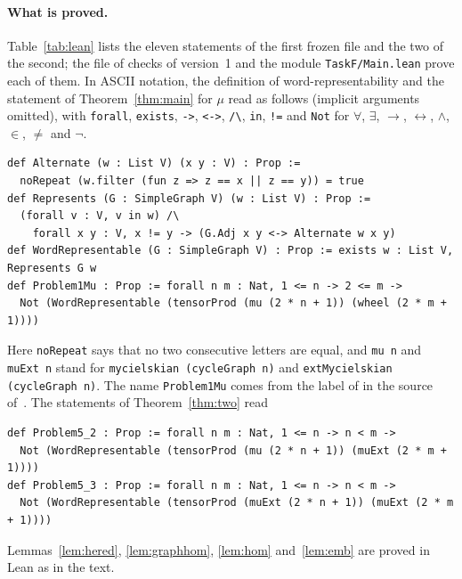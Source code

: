 \documentclass[11pt]{article}
\theoremstyle{remark}
\begin{document}
\paragraph{What is proved.}
Table~\ref{tab:lean} lists the eleven statements of the first frozen file and
the two of the second; the file of checks of version~1 and the module
\texttt{TaskF/Main.lean} prove each of them. In ASCII notation, the definition of
word-representability and the statement of Theorem~\ref{thm:main} for $\mu$
read as follows (implicit arguments omitted), with \texttt{forall}, \texttt{exists}, \texttt{->},
\verb|<->|, \verb|/\|, \texttt{in}, \texttt{!=} and \texttt{Not} for
$\forall$, $\exists$, $\to$, $\leftrightarrow$, $\wedge$, $\in$, $\ne$ and
$\neg$.
{\footnotesize
\begin{verbatim}
def Alternate (w : List V) (x y : V) : Prop :=
  noRepeat (w.filter (fun z => z == x || z == y)) = true
def Represents (G : SimpleGraph V) (w : List V) : Prop :=
  (forall v : V, v in w) /\
    forall x y : V, x != y -> (G.Adj x y <-> Alternate w x y)
def WordRepresentable (G : SimpleGraph V) : Prop := exists w : List V, Represents G w
def Problem1Mu : Prop := forall n m : Nat, 1 <= n -> 2 <= m ->
  Not (WordRepresentable (tensorProd (mu (2 * n + 1)) (wheel (2 * m + 1))))
\end{verbatim}}
\noindent Here \texttt{noRepeat} says that no two consecutive letters are
equal, and \texttt{mu n} and \texttt{muExt n} stand for
\texttt{mycielskian (cycleGraph n)} and \texttt{extMycielskian (cycleGraph n)}.
The name \texttt{Problem1Mu} comes from the label of
\cite[Problem~5.1]{alsh} in the source of~\cite{alsh}. The statements of
Theorem~\ref{thm:two} read
{\footnotesize
\begin{verbatim}
def Problem5_2 : Prop := forall n m : Nat, 1 <= n -> n < m ->
  Not (WordRepresentable (tensorProd (mu (2 * n + 1)) (muExt (2 * m + 1))))
def Problem5_3 : Prop := forall n m : Nat, 1 <= n -> n < m ->
  Not (WordRepresentable (tensorProd (muExt (2 * n + 1)) (muExt (2 * m + 1))))
\end{verbatim}}
Lemmas~\ref{lem:hered}, \ref{lem:graphhom}, \ref{lem:hom}
and~\ref{lem:emb} are proved in Lean as in the text.
\end{document}
